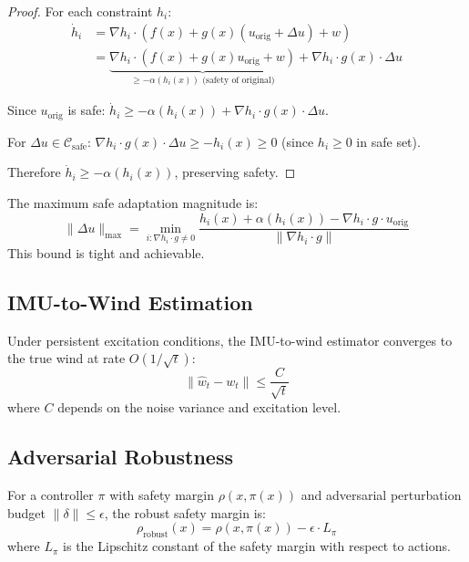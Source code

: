 \begin{proof}
For each constraint $h_i$:
\begin{align}
    \dot{h}_i &= \nabla h_i \cdot (f(x) + g(x)(u_{\text{orig}} + \Delta u) + w) \\
    &= \underbrace{\nabla h_i \cdot (f(x) + g(x)u_{\text{orig}} + w)}_{\geq -\alpha(h_i(x)) \text{ (safety of original)}} + \nabla h_i \cdot g(x) \cdot \Delta u
\end{align}

Since $u_{\text{orig}}$ is safe: $\dot{h}_i \geq -\alpha(h_i(x)) + \nabla h_i \cdot g(x) \cdot \Delta u$.

For $\Delta u \in \mathcal{C}_{\text{safe}}$: $\nabla h_i \cdot g(x) \cdot \Delta u \geq -h_i(x) \geq 0$ (since $h_i \geq 0$ in safe set).

Therefore $\dot{h}_i \geq -\alpha(h_i(x))$, preserving safety.
\end{proof}

\begin{theorem}
\label{thm:adaptation_bound}
The maximum safe adaptation magnitude is:
\begin{equation}
    \|\Delta u\|_{\max} = \min_{i: \nabla h_i \cdot g \neq 0} \frac{h_i(x) + \alpha(h_i(x)) - \nabla h_i \cdot g \cdot u_{\text{orig}}}{\|\nabla h_i \cdot g\|}
\end{equation}
This bound is tight and achievable.
\end{theorem}

\subsection{IMU-to-Wind Estimation}

\begin{theorem}
\label{thm:wind_estimation}
Under persistent excitation conditions, the IMU-to-wind estimator converges to the true wind at rate $O(1/\sqrt{t})$:
\begin{equation}
    \|\hat{w}_t - w_t\| \leq \frac{C}{\sqrt{t}}
\end{equation}
where $C$ depends on the noise variance and excitation level.
\end{theorem}

\subsection{Adversarial Robustness}

\begin{theorem}
\label{thm:adversarial_robustness}
For a controller $\pi$ with safety margin $\rho(x, \pi(x))$ and adversarial perturbation budget $\|\delta\| \leq \epsilon$, the robust safety margin is:
\begin{equation}
    \rho_{\text{robust}}(x) = \rho(x, \pi(x)) - \epsilon \cdot L_\pi
\end{equation}
where $L_\pi$ is the Lipschitz constant of the safety margin with respect to actions.
\end{theorem}

